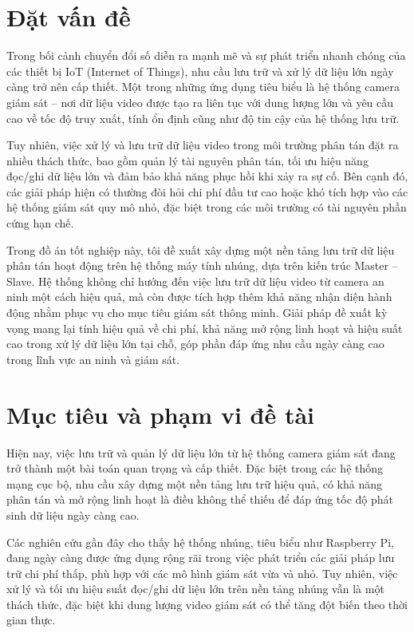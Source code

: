 \documentclass[../main.tex]{subfiles}
\begin{document}
\section{Đặt vấn đề}
\label{sec:dvd}
Trong bối cảnh chuyển đổi số diễn ra mạnh mẽ và sự phát triển nhanh chóng của các thiết bị IoT (Internet of Things), nhu cầu lưu trữ và xử lý dữ liệu lớn ngày càng trở nên cấp thiết. Một trong những ứng dụng tiêu biểu là hệ thống camera giám sát – nơi dữ liệu video được tạo ra liên tục với dung lượng lớn và yêu cầu cao về tốc độ truy xuất, tính ổn định cũng như độ tin cậy của hệ thống lưu trữ.

Tuy nhiên, việc xử lý và lưu trữ dữ liệu video trong môi trường phân tán đặt ra nhiều thách thức, bao gồm quản lý tài nguyên phân tán, tối ưu hiệu năng đọc/ghi dữ liệu lớn và đảm bảo khả năng phục hồi khi xảy ra sự cố. Bên cạnh đó, các giải pháp hiện có thường đòi hỏi chi phí đầu tư cao hoặc khó tích hợp vào các hệ thống giám sát quy mô nhỏ, đặc biệt trong các môi trường có tài nguyên phần cứng hạn chế.

Trong đồ án tốt nghiệp này, tôi đề xuất xây dựng một nền tảng lưu trữ dữ liệu phân tán hoạt động trên hệ thống máy tính nhúng, dựa trên kiến trúc Master – Slave. Hệ thống không chỉ hướng đến việc lưu trữ dữ liệu video từ camera an ninh một cách hiệu quả, mà còn được tích hợp thêm khả năng nhận diện hành động nhằm phục vụ cho mục tiêu giám sát thông minh. Giải pháp đề xuất kỳ vọng mang lại tính hiệu quả về chi phí, khả năng mở rộng linh hoạt và hiệu suất cao trong xử lý dữ liệu lớn tại chỗ, góp phần đáp ứng nhu cầu ngày càng cao trong lĩnh vực an ninh và giám sát.
\section{Mục tiêu và phạm vi đề tài} 
\label{sec:giaiphap}
Hiện nay, việc lưu trữ và quản lý dữ liệu lớn từ hệ thống camera giám sát đang trở thành một bài toán quan trọng và cấp thiết. Đặc biệt trong các hệ thống mạng cục bộ, nhu cầu xây dựng một nền tảng lưu trữ hiệu quả, có khả năng phân tán và mở rộng linh hoạt là điều không thể thiếu để đáp ứng tốc độ phát sinh dữ liệu ngày càng cao.

Các nghiên cứu gần đây cho thấy hệ thống nhúng, tiêu biểu như Raspberry Pi, đang ngày càng được ứng dụng rộng rãi trong việc phát triển các giải pháp lưu trữ chi phí thấp, phù hợp với các mô hình giám sát vừa và nhỏ. Tuy nhiên, việc xử lý và tối ưu hiệu suất đọc/ghi dữ liệu lớn trên nền tảng nhúng vẫn là một thách thức, đặc biệt khi dung lượng video giám sát có thể tăng đột biến theo thời gian thực.
\end{document}
